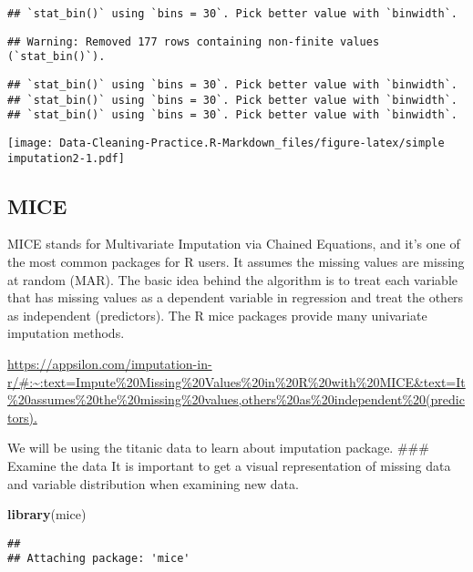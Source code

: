 \documentclass[
]{article}
\newenvironment{Shaded}{\begin{snugshade}}{\end{snugshade}}
\newcommand{\FunctionTok}[1]{\textcolor[rgb]{0.13,0.29,0.53}{\textbf{#1}}}
\newcommand{\NormalTok}[1]{#1}
\begin{document}
\begin{verbatim}
## `stat_bin()` using `bins = 30`. Pick better value with `binwidth`.
\end{verbatim}

\begin{verbatim}
## Warning: Removed 177 rows containing non-finite values (`stat_bin()`).
\end{verbatim}

\begin{verbatim}
## `stat_bin()` using `bins = 30`. Pick better value with `binwidth`.
## `stat_bin()` using `bins = 30`. Pick better value with `binwidth`.
## `stat_bin()` using `bins = 30`. Pick better value with `binwidth`.
\end{verbatim}

\texttt{[image: Data-Cleaning-Practice.R-Markdown\_files/figure-latex/simple imputation2-1.pdf]}

\hypertarget{mice}{%
\subsection{MICE}\label{mice}}

MICE stands for Multivariate Imputation via Chained Equations, and it's
one of the most common packages for R users. It assumes the missing
values are missing at random (MAR). The basic idea behind the algorithm
is to treat each variable that has missing values as a dependent
variable in regression and treat the others as independent (predictors).
The R mice packages provide many univariate imputation methods.

\url{https://appsilon.com/imputation-in-r/\#:~:text=Impute\%20Missing\%20Values\%20in\%20R\%20with\%20MICE\&text=It\%20assumes\%20the\%20missing\%20values,others\%20as\%20independent\%20(predictors).}

We will be using the titanic data to learn about imputation package.
\#\#\# Examine the data It is important to get a visual representation
of missing data and variable distribution when examining new data.

\begin{Shaded}
\begin{Highlighting}[]
\FunctionTok{library}\NormalTok{(mice)}
\end{Highlighting}
\end{Shaded}

\begin{verbatim}
## 
## Attaching package: 'mice'
\end{verbatim}
\end{document}

